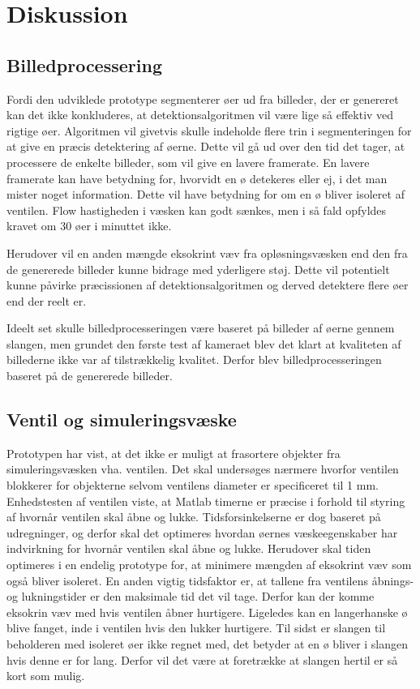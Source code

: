 \chapter{Diskussion}

\section{Billedprocessering}
Fordi den udviklede prototype segmenterer øer ud fra billeder, der er genereret kan det ikke konkluderes, at detektionsalgoritmen vil være lige så effektiv ved rigtige øer. Algoritmen vil givetvis skulle indeholde flere trin i segmenteringen for at give en præcis detektering af øerne. Dette vil gå ud over den tid det tager, at processere de enkelte billeder, som vil give en lavere framerate. En lavere framerate kan have betydning for, hvorvidt en ø detekeres eller ej, i det man mister noget information. Dette vil have betydning for om en ø bliver isoleret af ventilen. Flow hastigheden i væsken kan godt sænkes, men i så fald opfyldes kravet om 30 øer i minuttet ikke.

Herudover vil en anden mængde eksokrint væv fra opløsningsvæsken end den fra de genererede billeder kunne bidrage med yderligere støj. Dette vil potentielt kunne påvirke præcissionen af detektionsalgoritmen og derved detektere flere øer end der reelt er. 

Ideelt set skulle billedprocesseringen være baseret på billeder af øerne gennem slangen, men grundet den første test af kameraet blev det klart at kvaliteten af billederne ikke var af tilstrækkelig kvalitet. Derfor blev billedprocesseringen baseret på de genererede billeder. 

\section{Ventil og simuleringsvæske}
Prototypen har vist, at det ikke er muligt at frasortere objekter fra simuleringsvæsken vha. ventilen. Det skal undersøges nærmere hvorfor ventilen blokkerer for objekterne selvom ventilens diameter er specificeret til 1 mm. Enhedstesten af ventilen viste, at Matlab timerne er præcise i forhold til styring af hvornår ventilen skal åbne og lukke. Tidsforsinkelserne er dog baseret på udregninger, og derfor skal det optimeres hvordan øernes væskeegenskaber har indvirkning for hvornår ventilen skal åbne og lukke. Herudover skal tiden optimeres i en endelig prototype for, at minimere mængden af eksokrint væv som også bliver isoleret. En anden vigtig tidsfaktor er, at tallene fra ventilens åbnings- og lukningstider er den maksimale tid det vil tage. Derfor kan der komme eksokrin væv med hvis ventilen åbner hurtigere. Ligeledes kan en langerhanske ø blive fanget, inde i ventilen hvis den lukker hurtigere. Til sidst er slangen til beholderen med isoleret øer ikke regnet med, det betyder at en ø bliver i slangen hvis denne er for lang. Derfor vil det være at foretrække at slangen hertil er så kort som mulig.



